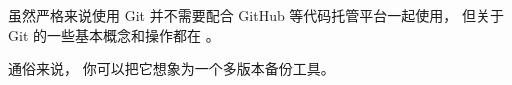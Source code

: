 
\begin{issues}
\issueDraft
\end{issues}


虽然严格来说使用 Git 并不需要配合 GitHub 等代码托管平台一起使用， 但关于 Git 的一些基本概念和操作都在 。

通俗来说， 你可以把它想象为一个多版本备份工具。